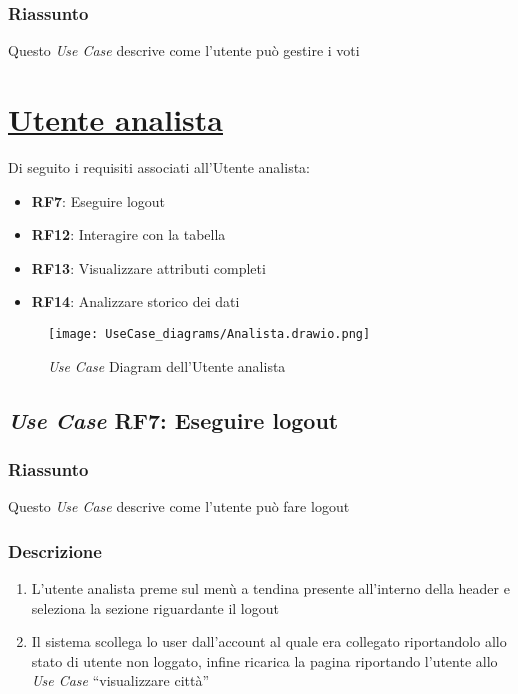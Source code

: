         \subsubsection{Riassunto}
            Questo \textit{Use Case} descrive come l'utente può gestire i voti


\section{\underline{Utente analista}}
    Di seguito i requisiti associati all'Utente analista:
    \begin{itemize}
        \item \textbf{RF7}: Eseguire logout
        \item \textbf{RF12}: Interagire con la tabella
        \item \textbf{RF13}: Visualizzare attributi completi
        \item \textbf{RF14}: Analizzare storico dei dati
    \end{itemize}
    \begin{figure}[H]
        \centering
        \texttt{[image: UseCase\_diagrams/Analista.drawio.png]}
        \caption{\textit{Use Case} Diagram dell'Utente analista}
    \end{figure}

    \subsection{\textit{Use Case} RF7: Eseguire logout}
        \subsubsection{Riassunto}
            Questo \textit{Use Case} descrive come l'utente può fare logout
        \subsubsection{Descrizione}
            \begin{enumerate}
                \item L'utente analista preme sul menù a tendina presente all'interno della header e seleziona la sezione riguardante il logout
                \item Il sistema scollega lo user dall'account al quale era collegato riportandolo allo stato di utente non loggato, infine 
                ricarica la pagina riportando l'utente allo \textit{Use Case} ``visualizzare città''
            \end{enumerate}

